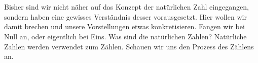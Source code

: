 \documentclass[11pt,a4paper,leqno]{report}
\newtheorem{definition}[theorem]{Definition}
\numberwithin{equation}{chapter}
\begin{document}
\\
\\
Bisher sind wir nicht n\"aher auf das Konzept der nat\"urlichen Zahl eingegangen, sondern haben eine gewisses Verst\"andnis desser vorausgesetzt. Hier wollen wir damit brechen und unsere Vorstellungen etwas konkretisieren.
Fangen wir bei Null an, oder eigentlich bei Eins. Was sind die nat\"urlichen Zahlen? Nat\"urliche Zahlen werden verwendet zum Z\"ahlen. Schauen wir uns den Prozess des Z\"ahlens an. 
\end{document}
